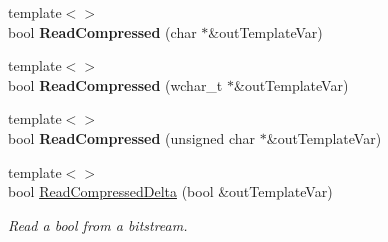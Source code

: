 \begin{DoxyCompactItemize}
\item 
\hypertarget{class_rak_net_1_1_bit_stream_ae6937061a4fa5933367b11e25dec1a0b}{{\footnotesize template$<$$>$ }\\bool {\bfseries Read\-Compressed} (char $\ast$\&out\-Template\-Var)}\label{class_rak_net_1_1_bit_stream_ae6937061a4fa5933367b11e25dec1a0b}

\item 
\hypertarget{class_rak_net_1_1_bit_stream_ae2c7b0ec2273e8e6f04d7c28f5d5b4f8}{{\footnotesize template$<$$>$ }\\bool {\bfseries Read\-Compressed} (wchar\-\_\-t $\ast$\&out\-Template\-Var)}\label{class_rak_net_1_1_bit_stream_ae2c7b0ec2273e8e6f04d7c28f5d5b4f8}

\item 
\hypertarget{class_rak_net_1_1_bit_stream_a5b733bcee145f0b7d28ca1698c5c7e61}{{\footnotesize template$<$$>$ }\\bool {\bfseries Read\-Compressed} (unsigned char $\ast$\&out\-Template\-Var)}\label{class_rak_net_1_1_bit_stream_a5b733bcee145f0b7d28ca1698c5c7e61}

\item 
{\footnotesize template$<$$>$ }\\bool \hyperlink{class_rak_net_1_1_bit_stream_ad83a446bd34af864078b1db95b151a54}{Read\-Compressed\-Delta} (bool \&out\-Template\-Var)
\begin{DoxyCompactList}\small\item\em Read a bool from a bitstream. \end{DoxyCompactList}\end{DoxyCompactItemize}
